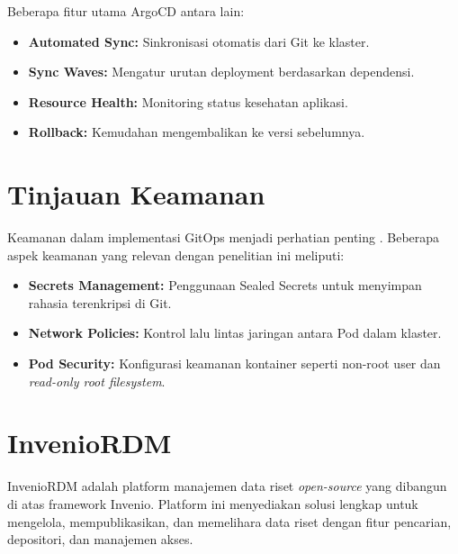 Beberapa fitur utama ArgoCD antara lain:

\begin{itemize}
    \item \textbf{Automated Sync:} Sinkronisasi otomatis dari Git ke klaster.
    \item \textbf{Sync Waves:} Mengatur urutan deployment berdasarkan dependensi.
    \item \textbf{Resource Health:} Monitoring status kesehatan aplikasi.
    \item \textbf{Rollback:} Kemudahan mengembalikan ke versi sebelumnya.
\end{itemize}

\section{Tinjauan Keamanan}

Keamanan dalam implementasi GitOps menjadi perhatian penting \citep{gitops-security}. Beberapa aspek keamanan yang relevan dengan penelitian ini meliputi:

\begin{itemize}
    \item \textbf{Secrets Management:} Penggunaan Sealed Secrets untuk menyimpan rahasia terenkripsi di Git.
    \item \textbf{Network Policies:} Kontrol lalu lintas jaringan antara Pod dalam klaster.
    \item \textbf{Pod Security:} Konfigurasi keamanan kontainer seperti non-root user dan \textit{read-only root filesystem}.
\end{itemize}

\section{InvenioRDM}

InvenioRDM adalah platform manajemen data riset \textit{open-source} yang dibangun di atas framework Invenio. Platform ini menyediakan solusi lengkap untuk mengelola, mempublikasikan, dan memelihara data riset dengan fitur pencarian, depositori, dan manajemen akses.
